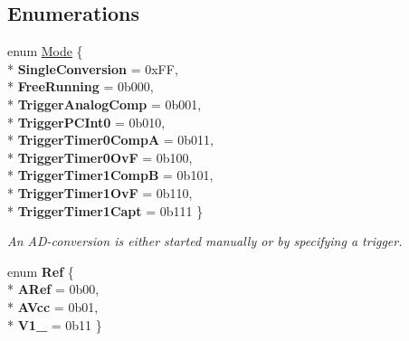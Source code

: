 \subsection*{Enumerations}
\begin{DoxyCompactItemize}
\item 
enum \hyperlink{namespaceadc_a8094fa55ea1a7729bb35c230163c0f8f}{Mode} \{ \\*
{\bfseries Single\+Conversion} = 0x\+FF, 
\\*
{\bfseries Free\+Running} = 0b000, 
\\*
{\bfseries Trigger\+Analog\+Comp} = 0b001, 
\\*
{\bfseries Trigger\+P\+C\+Int0} = 0b010, 
\\*
{\bfseries Trigger\+Timer0\+CompA} = 0b011, 
\\*
{\bfseries Trigger\+Timer0\+OvF} = 0b100, 
\\*
{\bfseries Trigger\+Timer1\+CompB} = 0b101, 
\\*
{\bfseries Trigger\+Timer1\+OvF} = 0b110, 
\\*
{\bfseries Trigger\+Timer1\+Capt} = 0b111
 \}\begin{DoxyCompactList}\small\item\em An A\+D-\/conversion is either started manually or by specifying a trigger. \end{DoxyCompactList}
\item 
enum {\bfseries Ref} \{ \\*
{\bfseries A\+Ref} = 0b00, 
\\*
{\bfseries A\+Vcc} = 0b01, 
\\*
{\bfseries V1\+\_} = 0b11
 \}\hypertarget{namespaceadc_adcbc814e47ddcec8104b574b02228d97}{}\label{namespaceadc_adcbc814e47ddcec8104b574b02228d97}

\end{DoxyCompactItemize}
